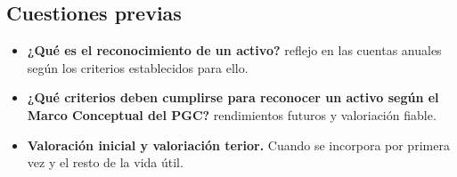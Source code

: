 \documentclass[a4paper,12pt]{article}
\begin{document}
\subsection{Cuestiones previas}
\begin{itemize}
    \item \textbf{¿Qué es el reconocimiento de un activo?} reflejo en las cuentas anuales según los criterios establecidos para ello.
    \item \textbf{¿Qué criterios deben cumplirse para reconocer un activo según el Marco Conceptual del PGC?} rendimientos futuros  y valoriación fiable.
    \item \textbf{Valoración inicial y valoriación terior.} Cuando se incorpora por primera vez y el resto de la vida útil.
\end{itemize}
\end{document}
